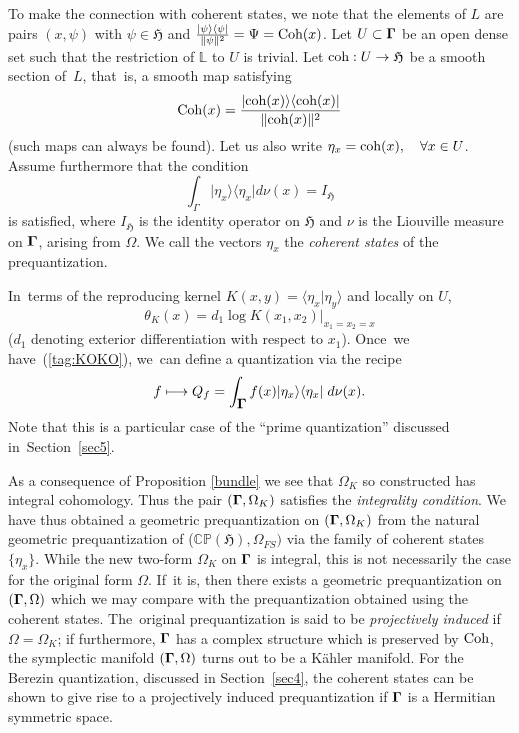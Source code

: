 \documentclass[11pt]{amsart}
\numberwithin{equation}{section}
\theoremstyle{remark}
\newcommand\HH{\mathfrak H}
\newcommand{\prhs}{{\mathbb C\mathbb P}( \HH)}
\newcommand{\bigam}{\mbox{\boldmath $\Gamma$}}
\begin{document}
To make the connection with coherent states, we note that the elements of
$L$ are pairs $(x, \psi)$ with $\psi \in \HH$ and
$\frac{\vert\psi\rangle\langle\psi\vert}{\Vert\psi\Vert^{2}} = \Psi =
\mbox{\rm Coh}(x)$. Let $U \subset \bigam$ be an open dense set such that the
restriction of $\mathbb L$ to $U$ is trivial. Let $\mbox{\rm coh}: U \to \HH$
be a smooth section of~$L$, that~is, a smooth map satisfying
\begin{equation}
\mbox{\rm Coh}(x) = \frac{\vert \mbox{\rm coh}(x) \rangle \langle \mbox{\rm
coh}(x) \vert }{\Vert \mbox{\rm coh}(x) \Vert^2}
\end{equation}
(such maps can always be found). Let us also write $\eta_x = \mbox{\rm coh}(x),
\quad \forall x \in U$. Assume furthermore that the condition
\begin{equation}
\int_\Gamma \vert \eta_x\rangle \langle \eta_x \vert d\nu(x) = I_{\HH}
\label{tag:KOKO}
\end{equation}
is satisfied, where $I_{\HH}$ is the identity operator on $\HH$ and $\nu$ is
the Liouville measure on $\bigam$, arising from $\Omega$. We call the vectors
$\eta_x$ the {\em coherent states} of the prequantization.

In~terms of the reproducing kernel $K(x,y) = \langle \eta_x \vert \eta_y
\rangle$ and locally on $U$,
$$ \theta_K(x) = d_1 \log K(x_1,x_2) \vert_{x_1 = x_2 = x}   $$
($d_1$ denoting exterior differentiation with respect to $x_1$). Once~we
have~(\ref{tag:KOKO}), we~can define a quantization via the recipe
\begin{equation}
 f \longmapsto Q_f = \int_{\bigam}f(x)
         \vert\eta_x\rangle\langle\eta_x\vert\; d\nu(x) .  \label{tag:RECE}
\end{equation}
Note that this is a particular case of the ``prime quantization'' discussed
in~Section~\ref{sec5}.

As a consequence of Proposition \ref{bundle} we see that $\Omega_{K} $ so
constructed has integral cohomology. Thus the pair $(\bigam, \Omega_{K} )$
satisfies the {\em integrality condition}. We have thus obtained a geometric
prequantization on $(\bigam,\Omega_{K})$ from the natural geometric
prequantization of ($\prhs , \Omega_{FS})$ via the family of coherent states
$\{\eta_x\}$.  While the new two-form $\Omega_{K}$ on $\bigam$  is integral,
this is not necessarily the case for the original form $\Omega$. If~it is, then
there exists a geometric prequantization on $(\bigam,\Omega)$ which we may
compare with the prequantization obtained using the coherent states.
The~original prequantization is said to be {\em projectively induced} if
$\Omega = \Omega_K$; if furthermore, $\bigam$ has a complex structure which is
preserved by $\mbox{\rm Coh}$,  the symplectic manifold $(\bigam, \Omega)$
turns out to be a K\"ahler manifold. For the Berezin quantization, discussed
in Section~\ref{sec4}, the coherent states can be shown to give rise to a
projectively induced prequantization if $\bigam$ is a Hermitian symmetric
space.
\end{document}
